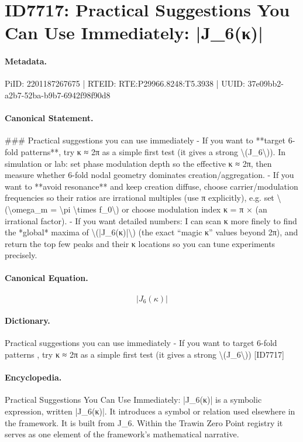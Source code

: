 \section*{ID7717: Practical Suggestions You Can Use Immediately: |J\_6(κ)|}
\paragraph{Metadata.}
PiID: 2201187267675 | RTEID: RTE:P29966.8248:T5.3938 | UUID: 37e09bb2-a2b7-52ba-b9b7-6942f98f90d8

\paragraph{Canonical Statement.}
\#\#\# Practical suggestions you can use immediately - If you want to **target 6-fold patterns**, try κ ≈ 2π as a simple first test (it gives a strong \textbackslash{}(J\_6\textbackslash{})). In simulation or lab: set phase modulation depth so the effective κ ≈ 2π, then measure whether 6-fold nodal geometry dominates creation/aggregation. - If you want to **avoid resonance** and keep creation diffuse, choose carrier/modulation frequencies so their ratios are irrational multiples (use π explicitly), e.g. set \textbackslash{}(\textbackslash{}omega\_m = \textbackslash{}pi \textbackslash{}times f\_0\textbackslash{}) or choose modulation index κ = π × (an irrational factor). - If you want detailed numbers: I can scan κ more finely to find the *global* maxima of \textbackslash{}(|J\_6(κ)|\textbackslash{}) (the exact “magic κ” values beyond 2π), and return the top few peaks and their κ locations so you can tune experiments precisely.

\paragraph{Canonical Equation.}
\[
|J_6(κ)|
\]

\paragraph{Dictionary.}
Practical suggestions you can use immediately - If you want to target 6-fold patterns , try κ ≈ 2π as a simple first test (it gives a strong \textbackslash{}(J\_6\textbackslash{})) [ID7717]

\paragraph{Encyclopedia.}
Practical Suggestions You Can Use Immediately: |J\_6(κ)| is a symbolic expression, written |J\_6(κ)|. It introduces a symbol or relation used elsewhere in the framework. It is built from J\_6. Within the Trawin Zero Point registry it serves as one element of the framework's mathematical narrative.
